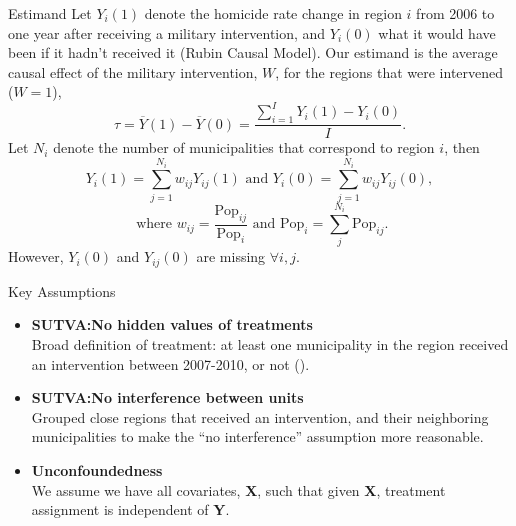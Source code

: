 \documentclass[final]{beamer}
\newlength{\onecolwid}
\begin{document}
\begin{frame}[t]
\begin{columns}[t]
\begin{column}{\onecolwid}
      \begin{block}{Estimand}
        Let $Y_i(1)$ denote the homicide rate change in region $i$ from 2006 to one year after receiving a military intervention, and $Y_i(0)$ what it would have been if it hadn't received it (Rubin Causal Model). Our estimand is the average causal effect of the military intervention,  $W$, for the regions that were intervened ($W=1$), $$\tau=\overline{Y}(1)-\overline{Y}(0)=\frac{\displaystyle\sum_{i=1}^{I} Y_i(1)-Y_i(0)}{I}.$$
        Let $N_i$ denote the number of municipalities that correspond to region $i$, then 
	$$Y_i(1) = \sum_{j=1}^{N_i}w_{ij}Y_{ij}(1) \textrm{ and } Y_i(0) = \sum_{j=1}^{N_i}w_{ij}Y_{ij}(0),$$	
	$$\textrm{ where }  w_{ij}= \frac{\textrm{Pop}_{ij}}{\textrm{Pop}_{i}} \textrm{ and  }\textrm{Pop}_{i}= \sum_j^{N_i}\textrm{Pop}_{ij}.$$
	However, $Y_i(0)$ and $Y_{ij}(0)$ are missing  $\forall i, j$.
      \end{block}
      \begin{block}{Key Assumptions}
        {\small 
        \begin{itemize}
          \item \textbf{SUTVA:No hidden values of treatments}\\
            Broad definition of treatment: at least one municipality in the region received an intervention between 2007-2010, or not (\cite{NEXOS}).
          \item \textbf{SUTVA:No interference between units} \\
             Grouped close regions that received an intervention, and their neighboring municipalities to make the ``no interference'' assumption  more reasonable. %
        \item \textbf{Unconfoundedness} \\
           We assume we have all covariates, \textbf{X}, such that given \textbf{X},  treatment assignment is independent of \textbf{Y}.

\end{itemize}}
\end{block}
\end{column}
\end{columns}
\end{frame}
\end{document}
